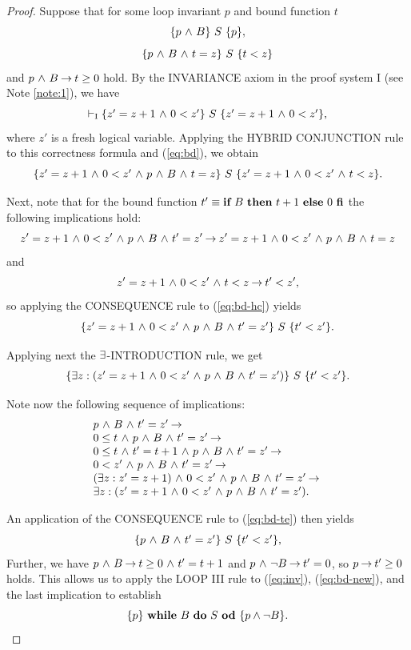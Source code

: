 \documentclass[manuscript, screen, review]{acmart}
\begin{document}
\begin{proof}
%
Suppose that for some loop invariant $p$ and bound function $t$
\begin{equation} \label{eq:inv}
\HT{p \A B}{S}{p},
\end{equation}
\begin{equation} \label{eq:bd}
\HT{p \A B \A t=z}{S}{t<z}
\end{equation}
and
$p \A B \ra t \geq 0$ hold.
By the INVARIANCE axiom in the proof system I (see Note \ref{note:1}),
we have
\[
\vdash_{\rm{I}}  \HT{z' = z+1 \A 0 < z'}{S}{z' = z+1 \A 0 < z'},
\]
where $z'$ is a fresh logical variable.
Applying the HYBRID CONJUNCTION rule to this correctness formula and (\ref{eq:bd}),
we obtain
\begin{equation}\label{eq:bd-hc}
 \HT{z' = z+1 \A 0 < z' \A p \A B \A t=z}{S}{z' = z+1 \A 0 < z' \A t<z}.
\end{equation}

Next, note that for the bound function $t' \equiv \ITE{B}{t+1}{0}$
the following implications hold:
\[
  z' = z+1 \A 0 < z' \A p \A B \A t'=z' \ra
    z' = z+1 \A 0 < z' \A p \A B \A t=z
\]
and
\[
  z' = z+1 \A 0 < z' \A t<z \ra t' < z',
\]
so applying the CONSEQUENCE rule to (\ref{eq:bd-hc}) yields
\[
  \HT{z' = z+1 \A 0 < z' \A p \A B \A t'=z'}{S}{t'<z'}.
\]

Applying next the $\te$-INTRODUCTION rule,  we get
\begin{equation}\label{eq:bd-te}
  \HT{\te z: (z' = z+1 \A 0 < z' \A p \A B \A t'=z')}{S}{t'<z'}.
\end{equation}

Note now the following sequence of implications:
\[
  \begin{array}{l}
    p \A B \A t'=z' \ra \\
    0 \leq t \A p \A B \A t'=z' \ra \\
    0 \leq t \A t' = t+1 \A p \A B \A t'=z' \ra \\
    0 < z' \A p \A B \A t'=z' \ra \\
    (\te z: z' = z+1) \A 0 < z' \A p \A B \A t'=z'  \ra \\
    \te z: (z' = z+1 \A 0 < z' \A p \A B \A t'=z'). 
  \end{array}
\]

An application of the CONSEQUENCE rule to (\ref{eq:bd-te}) then yields
\begin{equation}\label{eq:bd-new}
  \HT{p \A B \A t'=z'}{S}{t'<z'},
\end{equation}
Further, we have $p \A B \ra t \geq 0 \A t' = t+1$ and 
$p \A \neg B \ra t' = 0$, so 
$p \ra t' \geq 0$ holds.
This allows us to apply the LOOP III rule to (\ref{eq:inv}), (\ref{eq:bd-new}),
and the last implication to establish
\[
 \HT{p}{\WDD{B}{S}}{p \wedge \neg B}.
\]
\end{proof}
\end{document}
